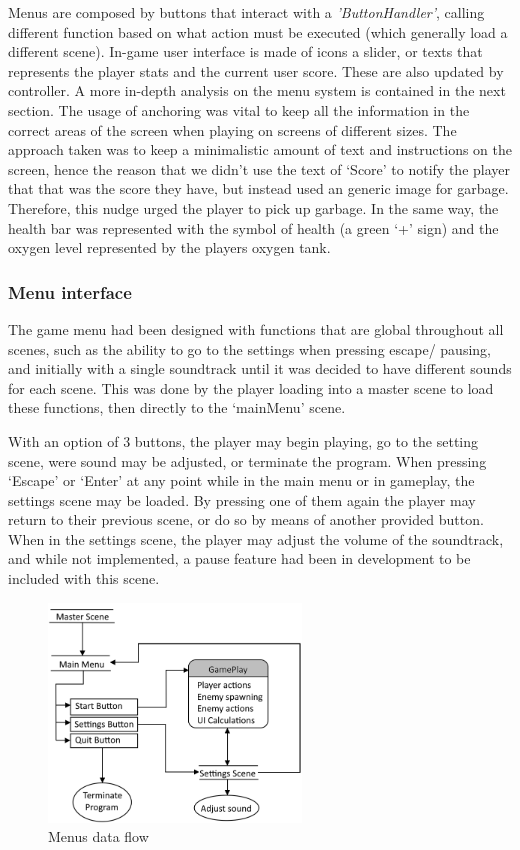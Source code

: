 \documentclass[11pt]{article}
\begin{document}
Menus are composed by buttons that interact with a \textit{'ButtonHandler'}, calling different function based on what action must be executed (which generally load a different scene). In-game user interface is made of icons a slider, or texts that represents the player stats and the current user score. These are also updated by controller. A more in-depth analysis on the menu system is contained in the next section.
The usage of anchoring was vital to keep all the information in the correct areas of the screen when playing on screens of different sizes.
The approach taken was to keep a minimalistic amount of text and instructions on the screen, hence the reason that we didn’t use the text of ‘Score’ to notify the player that that was the score they have, but instead used an generic image for garbage. Therefore, this nudge urged the player to pick up garbage. In the same way, the health bar was represented with the symbol of health (a green ‘+’ sign) and the oxygen level represented by the players oxygen tank.

\subsubsection{Menu interface}
The game menu had been designed with functions that are global throughout all scenes, such as the ability to go to the settings when pressing escape/ pausing, and initially with a single soundtrack until it was decided to have different sounds for each scene. This was done by the player loading into a master scene to load these functions, then directly to the ‘mainMenu’ scene.

With an option of 3 buttons, the player may begin playing, go to the setting scene, were sound may be adjusted, or terminate the program. When pressing ‘Escape’ or ‘Enter’ at any point while in the main menu or in gameplay, the settings scene may be loaded. By pressing one of them again the player may return to their previous scene, or do so by means of another provided button. When in the settings scene, the player may adjust the volume of the soundtrack, and while not implemented, a pause feature had been in development to be included with this scene.

\begin{figure}[H]
  \centering
  \includegraphics[width=0.6\textwidth]{figures/menu_system}
  \caption{Menus data flow}
\end{figure}
\end{document}
